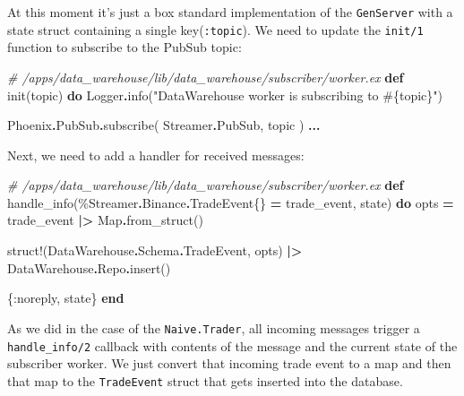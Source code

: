 \documentclass[
]{book}
\newenvironment{Shaded}{\begin{snugshade}}{\end{snugshade}}
\newcommand{\CommentTok}[1]{\textcolor[rgb]{0.56,0.35,0.01}{\textit{#1}}}
\newcommand{\ConstantTok}[1]{\textcolor[rgb]{0.00,0.00,0.00}{#1}}
\newcommand{\KeywordTok}[1]{\textcolor[rgb]{0.13,0.29,0.53}{\textbf{#1}}}
\newcommand{\NormalTok}[1]{#1}
\newcommand{\OperatorTok}[1]{\textcolor[rgb]{0.81,0.36,0.00}{\textbf{#1}}}
\newcommand{\OtherTok}[1]{\textcolor[rgb]{0.56,0.35,0.01}{#1}}
\newcommand{\StringTok}[1]{\textcolor[rgb]{0.31,0.60,0.02}{#1}}
\newcommand{\VariableTok}[1]{\textcolor[rgb]{0.00,0.00,0.00}{#1}}
\begin{document}
At this moment it's just a box standard implementation of the \texttt{GenServer} with a state struct containing a single key(\texttt{:topic}). We need to update the \texttt{init/1} function to subscribe to the PubSub topic:

\begin{Shaded}
\begin{Highlighting}[]
\CommentTok{\# /apps/data\_warehouse/lib/data\_warehouse/subscriber/worker.ex}
  \KeywordTok{def}\NormalTok{ init(topic) }\KeywordTok{do}
    \ConstantTok{Logger}\OperatorTok{.}\NormalTok{info(}\StringTok{"DataWarehouse worker is subscribing to }\OtherTok{\#\{}\NormalTok{topic}\OtherTok{\}}\StringTok{"}\NormalTok{)}

    \ConstantTok{Phoenix}\OperatorTok{.}\ConstantTok{PubSub}\OperatorTok{.}\NormalTok{subscribe(}
      \ConstantTok{Streamer}\OperatorTok{.}\ConstantTok{PubSub}\NormalTok{,}
\NormalTok{      topic}
\NormalTok{    )}
    \OperatorTok{...}
\end{Highlighting}
\end{Shaded}

Next, we need to add a handler for received messages:

\begin{Shaded}
\begin{Highlighting}[]
\CommentTok{\# /apps/data\_warehouse/lib/data\_warehouse/subscriber/worker.ex}
  \KeywordTok{def}\NormalTok{ handle\_info(\%}\ConstantTok{Streamer}\OperatorTok{.}\ConstantTok{Binance}\OperatorTok{.}\ConstantTok{TradeEvent}\NormalTok{\{\} }\OperatorTok{=}\NormalTok{ trade\_event, state) }\KeywordTok{do}
\NormalTok{    opts }\OperatorTok{=}
\NormalTok{      trade\_event}
      \OperatorTok{|\textgreater{}} \ConstantTok{Map}\OperatorTok{.}\NormalTok{from\_struct()}

\NormalTok{    struct!(}\ConstantTok{DataWarehouse}\OperatorTok{.}\ConstantTok{Schema}\OperatorTok{.}\ConstantTok{TradeEvent}\NormalTok{, opts)}
    \OperatorTok{|\textgreater{}} \ConstantTok{DataWarehouse}\OperatorTok{.}\ConstantTok{Repo}\OperatorTok{.}\NormalTok{insert()}

\NormalTok{    \{}\VariableTok{:noreply}\NormalTok{, state\}}
  \KeywordTok{end}
\end{Highlighting}
\end{Shaded}

As we did in the case of the \texttt{Naive.Trader}, all incoming messages trigger a \texttt{handle\_info/2} callback with contents of the message and the current state of the subscriber worker. We just convert that incoming trade event to a map and then that map to the \texttt{TradeEvent} struct that gets inserted into the database.
\end{document}
